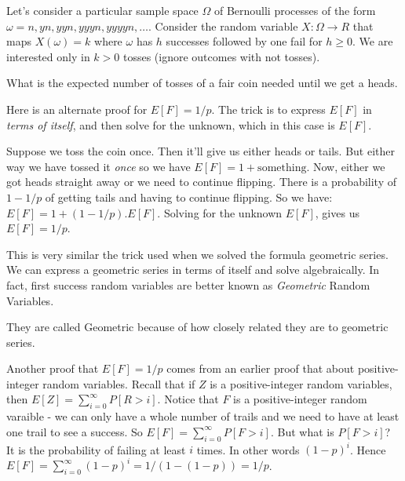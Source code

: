 Let's consider a particular sample space $\Omega$ of Bernoulli processes 
of the form $\omega = n, yn, yyn, yyyn, yyyyn, \ldots$.
Consider the random variable $X : \Omega \rightarrow R$
that maps $X(\omega) = k$ where 
$\omega$ has $h$ successes followed by one fail for $h \geqslant 0$.
We are interested only in $k > 0$ tosses (ignore outcomes with not tosses).

\frmrule

\begin{example}
What is the expected number of tosses of a fair coin 
needed until we get a heads.
\end{example}


\frmrule

Here is an alternate proof for $E[F] = 1/p$. 
The trick is to express $E[F]$ in \textit{terms of itself}, and then 
solve for the unknown, which in this case is $E[F]$.

Suppose we toss the coin once.
Then it'll give us either heads or tails. But either way 
we have tossed it \textit{once} so we have $E[F] = 1 + \text{something}$.
Now, either 
we got heads straight away or we need to continue flipping.
There is a probability of $1-1/p$ of getting tails and having to continue flipping. 
So we have: $E[F] = 1 + (1-1/p).E[F]$. 
Solving for the unknown $E[F]$, gives us $E[F] = 1/p$. 

This is very similar the trick used when we solved the formula geometric series. 
We can express a geometric series in terms of itself and solve algebraically. 
In fact, first success random variables are better known 
as \textit{Geometric} Random Variables. 


They are called Geometric because of how closely related they 
are to geometric series.

\frmrule

Another proof that $E[F] = 1/p$ comes from an earlier proof that 
about positive-integer random variables. 
Recall that if $Z$ is a positive-integer random variables, then 
$E[Z] = \sum^{\infty}_{i=0}P[R > i]$. Notice that $F$ 
is a positive-integer random varaible - we can only have a whole number 
of trails and we need to have at least one trail to see a success. 
So $E[F] = \sum^{\infty}_{i=0}P[F > i]$. But what is $P[F > i]$? 
It is the probability of failing at least $i$ times. In other words $(1-p)^i$. 
Hence $E[F] = \sum^{\infty}_{i=0}(1-p)^i = 1/(1-(1-p)) = 1/p$.